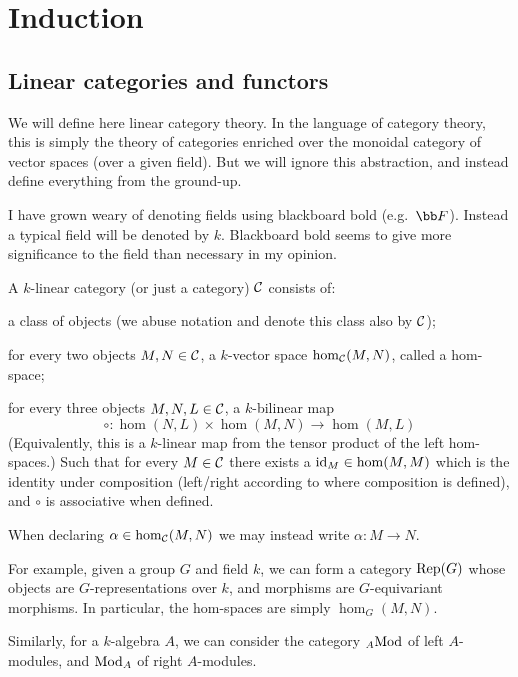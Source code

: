 \section{Induction}

\subsection{Linear categories and functors}

We will define here linear category theory.
In the language of category theory, this is simply the theory of categories enriched over the monoidal category of vector spaces (over a given field).
But we will ignore this abstraction, and instead define everything from the ground-up.

\bnote

    I have grown weary of denoting fields using blackboard bold (e.g.\ $\bF$).
    Instead a typical field will be denoted by $k$.
    Blackboard bold seems to give more significance to the field than necessary in my opinion.

\enote

\bdefn

    A {\emphcolor $k$-linear category} (or just a category) ${{\cal C}}$ consists of:
    \benum
        \item a class of objects (we abuse notation and denote this class also by ${{\cal C}}$);
        \item for every two objects $M,N\in{{\cal C}}$, a $k$-vector space $\hom_{{\cal C}}(M,N)$, called a {\emphcolor hom-space};
        \item for every three objects $M,N,L\in{{\cal C}}$, a $k$-bilinear map
        $$ {\circ}\colon\hom(N,L)\times\hom(M,N)\to\hom(M,L) $$
        (Equivalently, this is a $k$-linear map from the tensor product of the left hom-spaces.)
        Such that for every $M\in{{\cal C}}$ there exists a ${\rm id}_M\in\hom(M,M)$ which is the identity under composition (left/right according to where composition is defined), and $\circ$ is associative
        when defined.
    \eenum

\edefn

When declaring $\alpha\in\hom_{{\cal C}}(M,N)$ we may instead write $\alpha\colon M\to N$.

For example, given a group $G$ and field $k$, we can form a category ${\rm Rep}(G)$ whose objects are $G$-representations over $k$, and morphisms are $G$-equivariant morphisms.
In particular, the hom-spaces are simply $\hom_G(M,N)$.

Similarly, for a $k$-algebra $A$, we can consider the category ${}_A{\rm Mod}$ of left $A$-modules, and ${\rm Mod}_A$ of right $A$-modules.

